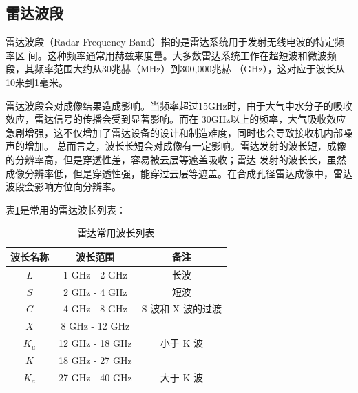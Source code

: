 \documentclass{xduugthesis}
\begin{document}
\subsection{雷达波段}
雷达波段（Radar Frequency Band）\cite{Radar_Frequency_Width}指的是雷达系统用于发射无线电波的特定频率区
间。这种频率通常用赫兹来度量。大多数雷达系统工作在超短波和微波频段，其频率范围大约从30兆赫（MHz）到300,000兆赫
（GHz），这对应于波长从10米到1毫米。\par
雷达波段会对成像结果造成影响。当频率超过15GHz时，由于大气中水分子的吸收效应，雷达信号的传播会受到显著影响。而在
30GHz以上的频率，大气吸收效应急剧增强，这不仅增加了雷达设备的设计和制造难度，同时也会导致接收机内部噪声的增加。
总而言之，波长长短会对成像有一定影响。雷达发射的波长短，成像的分辨率高，但是穿透性差，容易被云层等遮盖吸收；雷达
发射的波长长，虽然成像分辨率低，但是穿透性强，能穿过云层等遮盖。在合成孔径雷达成像中，雷达波段会影响方位向分辨率。\par
表\ref{Radar_Wavelength_Table}是常用的雷达波长列表\cite{SAR_Radar_Wavelenngth}：
\begin{table}[!htb]
	\begin{center}
		\caption{雷达常用波长列表}\label{Radar_Wavelength_Table}
		\begin{tabular}{|c|c|c|}
			\hline
			\textbf{波长名称} & \textbf{波长范围} & \textbf{备注}\\
			\hline
			$L$ & 1 GHz - 2 GHz & 长波 \\
			\hline
			$S$ & 2 GHz - 4 GHz & 短波 \\
			\hline
			$C$ & 4 GHz - 8 GHz & S 波和 X 波的过渡 \\
			\hline
			$X$ & 8 GHz - 12 GHz &  \\
			\hline
			$K_u$ & 12 GHz - 18 GHz & 小于 K 波 \\
			\hline
			$K$ & 18 GHz - 27 GHz &  \\
			\hline
			$K_a$ & 27 GHz - 40 GHz & 大于 K 波 \\
			\hline
		\end{tabular}
	\end{center}
\end{table}
\vspace{-1em} 
\end{document}

